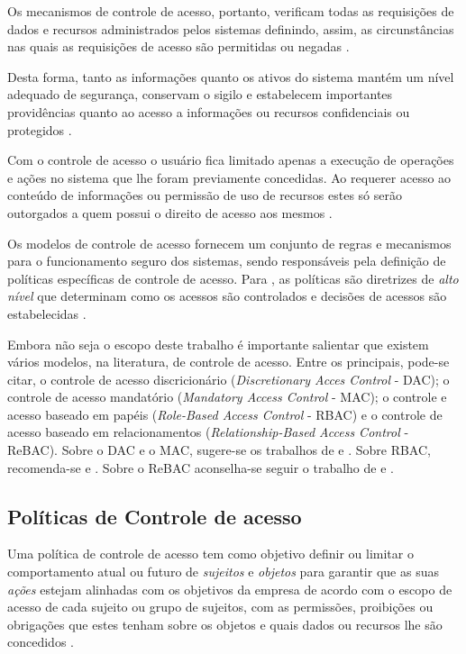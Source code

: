 Os mecanismos de controle de acesso, portanto, verificam todas as requisições de dados e recursos administrados pelos sistemas definindo, assim, as circunstâncias nas quais as requisições de acesso são permitidas ou negadas \cite{sandhu:1996}. 

Desta forma, tanto as informações quanto os ativos do sistema mantém um nível adequado de segurança, conservam o sigilo e estabelecem importantes providências quanto ao acesso a informações ou recursos confidenciais ou protegidos \cite{wang_conflicts_2010}.

Com o controle de acesso o usuário fica limitado apenas a execução de operações e ações no sistema que lhe foram previamente concedidas. Ao requerer acesso ao conteúdo de informações ou permissão de uso de recursos estes só serão outorgados a quem possui o direito de acesso aos mesmos \cite{ferraiolo_proposed_2001}.

Os modelos de controle de acesso fornecem um conjunto de regras e mecanismos para o funcionamento seguro dos sistemas, sendo responsáveis pela definição de políticas específicas de controle de acesso. Para , as políticas são diretrizes de \textit{alto nível} que determinam como os acessos são controlados e decisões de acessos são estabelecidas \cite{di_vimercati_policies_2005} \cite{sarkis2017} \cite{lopes_adopcao_2012}.

Embora não seja o escopo deste trabalho é importante salientar que existem vários modelos, na literatura, de controle de acesso. Entre os principais, pode-se citar, o controle de acesso discricionário (\textit{Discretionary Acces Control} - DAC); o controle de acesso mandatório (\textit{Mandatory Access Control} - MAC); o controle e acesso baseado em papéis (\textit{Role-Based Access Control} - RBAC) e o controle de acesso baseado em relacionamentos (\textit{Relationship-Based Access Control} - ReBAC). Sobre o DAC e o MAC, sugere-se os trabalhos de  e . Sobre RBAC, recomenda-se  e . Sobre o ReBAC aconselha-se seguir o trabalho de  e .

\subsection{Políticas de Controle de acesso}\label{controle_acesso}

Uma política de controle de acesso tem como objetivo definir ou limitar o comportamento atual ou futuro de \textit{sujeitos} e \textit{objetos} para garantir que as suas \textit{ações} estejam alinhadas com os objetivos da empresa de acordo com o escopo de acesso de cada sujeito ou grupo de sujeitos, com as permissões, proibições ou obrigações que estes tenham sobre os objetos e quais dados ou recursos lhe são concedidos \cite{dunlop_dynamic_2002}\cite{sarkis2017}.

